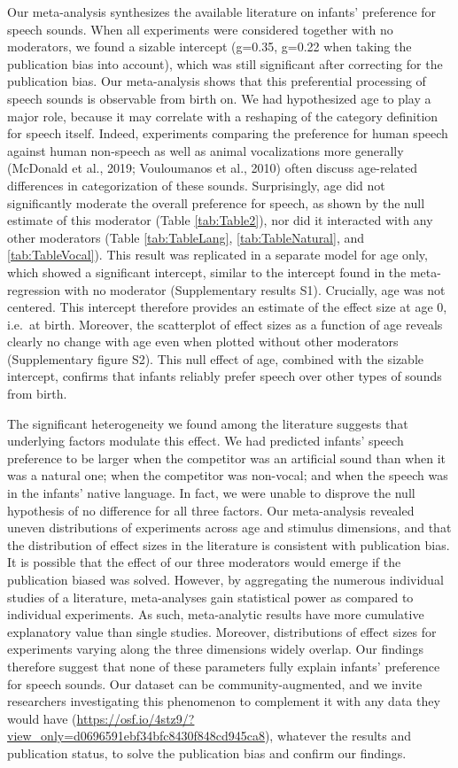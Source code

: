 \documentclass[
  english,
  man]{apa6}
\begin{document}
Our meta-analysis synthesizes the available literature on infants' preference for speech sounds. When all experiments were considered together with no moderators, we found a sizable intercept (g=0.35, g=0.22 when taking the publication bias into account), which was still significant after correcting for the publication bias. Our meta-analysis shows that this preferential processing of speech sounds is observable from birth on. We had hypothesized age to play a major role, because it may correlate with a reshaping of the category definition for speech itself. Indeed, experiments comparing the preference for human speech against human non-speech as well as animal vocalizations more generally (McDonald et al., 2019; Vouloumanos et al., 2010) often discuss age-related differences in categorization of these sounds. Surprisingly, age did not significantly moderate the overall preference for speech, as shown by the null estimate of this moderator (Table \ref{tab:Table2}), nor did it interacted with any other moderators (Table \ref{tab:TableLang}, \ref{tab:TableNatural}, and \ref{tab:TableVocal}). This result was replicated in a separate model for age only, which showed a significant intercept, similar to the intercept found in the meta-regression with no moderator (Supplementary results S1). Crucially, age was not centered. This intercept therefore provides an estimate of the effect size at age 0, i.e.~at birth. Moreover, the scatterplot of effect sizes as a function of age reveals clearly no change with age even when plotted without other moderators (Supplementary figure S2). This null effect of age, combined with the sizable intercept, confirms that infants reliably prefer speech over other types of sounds from birth.

The significant heterogeneity we found among the literature suggests that underlying factors modulate this effect. We had predicted infants' speech preference to be larger when the competitor was an artificial sound than when it was a natural one; when the competitor was non-vocal; and when the speech was in the infants' native language. In fact, we were unable to disprove the null hypothesis of no difference for all three factors. Our meta-analysis revealed uneven distributions of experiments across age and stimulus dimensions, and that the distribution of effect sizes in the literature is consistent with publication bias. It is possible that the effect of our three moderators would emerge if the publication biased was solved. However, by aggregating the numerous individual studies of a literature, meta-analyses gain statistical power as compared to individual experiments. As such, meta-analytic results have more cumulative explanatory value than single studies. Moreover, distributions of effect sizes for experiments varying along the three dimensions widely overlap. Our findings therefore suggest that none of these parameters fully explain infants' preference for speech sounds. Our dataset can be community-augmented, and we invite researchers investigating this phenomenon to complement it with any data they would have (\url{https://osf.io/4stz9/?view_only=d0696591ebf34bfc8430f848cd945ca8}), whatever the results and publication status, to solve the publication bias and confirm our findings.
\end{document}
